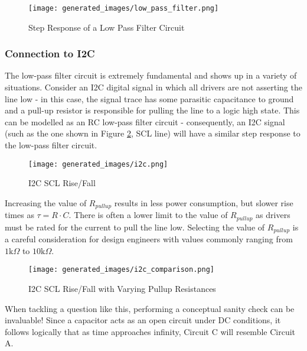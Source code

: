 \documentclass[main.tex]{subfiles}
\begin{document}
\begin{figure}[H]
    \centering
    \texttt{[image: generated\_images/low\_pass\_filter.png]}
    \caption{Step Response of a Low Pass Filter Circuit}
    \label{fig:step-response-low-pass-filter}
\end{figure}

\subsubsection{Connection to I2C}
The low-pass filter circuit is extremely fundamental and shows up in a variety of situations. Consider an I2C digital signal in which all drivers are not asserting the line low - in this case, the signal trace has some parasitic capacitance to ground and a pull-up resistor is responsible for pulling the line to a logic high state. This can be modelled as an RC low-pass filter circuit - consequently, an I2C signal (such as the one shown in Figure \ref{fig:i2c_scl}, SCL line) will have a similar step response to the low-pass filter circuit.

\begin{figure}[H]
    \centering
    \texttt{[image: generated\_images/i2c.png]}
    \caption{I2C SCL Rise/Fall}
    \label{fig:i2c_scl}
\end{figure}

\noindent Increasing the value of $R_{pullup}$ results in less power consumption, but slower rise times as $\tau = R \cdot C$. There is often a lower limit to the value of $R_{pullup}$ as drivers must be rated for the current to pull the line low. Selecting the value of $R_{pullup}$ is a careful consideration for design engineers with values commonly ranging from $1 \text{k} \Omega$ to $10 \text{k} \Omega$.

\begin{figure}[H]
    \centering
    \texttt{[image: generated\_images/i2c\_comparison.png]}
    \caption{I2C SCL Rise/Fall with Varying Pullup Resistances}
    \label{fig:i2c_comparison}
\end{figure}


\noindent When tackling a question like this, performing a conceptual sanity check can be invaluable! Since a capacitor acts as an open circuit under DC conditions, it follows logically that as time approaches infinity, Circuit C will resemble Circuit A. 
\end{document}
